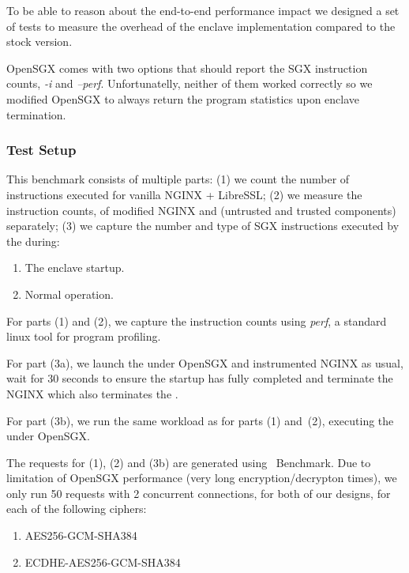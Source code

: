 \documentclass[../../../main.tex]{subfiles}
\begin{document}
\label{sec:cpu-instr-analysis}
To be able to reason about the end-to-end performance impact we designed a set
of tests to measure the overhead of the enclave implementation compared to the
stock version.


OpenSGX comes with two options that should report the SGX instruction counts,
\textit{-i} and \textit{--perf}. Unfortunatelly, neither of them worked
correctly so we modified OpenSGX to always return the program statistics upon
enclave termination.

\subsubsection*{Test Setup}
This benchmark consists of multiple parts: (1) we count the number of
instructions executed for vanilla NGINX + LibreSSL; (2) we measure the
instruction counts, of modified NGINX and \enclavemodel (untrusted and trusted
components) separately; (3) we capture the number and type of SGX instructions
executed by the \enclaveprogram during:
\begin{enumerate}[label=3\alph*)]
  \item The enclave startup.
  \item Normal operation.
\end{enumerate}

For parts (1) and (2), we capture the instruction counts using \textit{perf},
a standard linux tool for program profiling.

For part (3a), we launch the \enclaveprogram under OpenSGX and instrumented
NGINX as usual, wait for 30 seconds to ensure the startup has fully completed
and terminate the NGINX which also terminates the \enclaveprogram.

For part (3b), we run the same workload as for parts (1) and~(2), executing
the \enclaveprogram under OpenSGX.

The requests for (1), (2) and (3b) are generated using \Apache~Benchmark. Due
to limitation of OpenSGX performance (very long encryption/decrypton times),
we only run 50 requests with 2 concurrent connections, for both of our
designs, for each of the following ciphers:
\begin{enumerate}
  \item AES256-GCM-SHA384
  \item ECDHE-AES256-GCM-SHA384
\end{enumerate}
\end{document}
